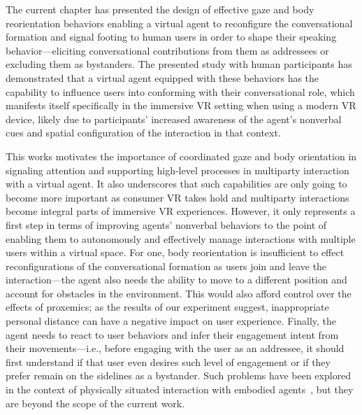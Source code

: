 The current chapter has presented the design of effective gaze and body reorientation behaviors enabling a virtual agent to reconfigure the conversational formation and signal footing to human users in order to shape their speaking behavior---eliciting conversational contributions from them as addressees or excluding them as bystanders. The presented study with human participants has demonstrated that a virtual agent equipped with these behaviors has the capability to influence users into conforming with their conversational role, which manifests itself specifically in the immersive VR setting when using a modern VR device, likely due to participants' increased awareness of the agent's nonverbal cues and spatial configuration of the interaction in that context.

This works motivates the importance of coordinated gaze and body orientation in signaling attention and supporting high-level processes in multiparty interaction with a virtual agent. It also underscores that such capabilities are only going to become more important as consumer VR takes hold and multiparty interactions become integral parts of immersive VR experiences. However, it only represents a first step in terms of improving agents' nonverbal behaviors to the point of enabling them to autonomously and effectively manage interactions with multiple users within a virtual space. For one, body reorientation is insufficient to effect reconfigurations of the conversational formation as users join and leave the interaction---the agent also needs the ability to move to a different position and account for obstacles in the environment. This would also afford control over the effects of proxemics; as the results of our experiment suggest, inappropriate personal distance can have a negative impact on user experience. Finally, the agent needs to react to user behaviors and infer their engagement intent from their movements---i.e., before engaging with the user as an addressee, it should first understand if that user even desires such level of engagement or if they prefer remain on the sidelines as a bystander. Such problems have been explored in the context of physically situated interaction with embodied agents~\citep{bohus2009models}, but they are beyond the scope of the current work. 